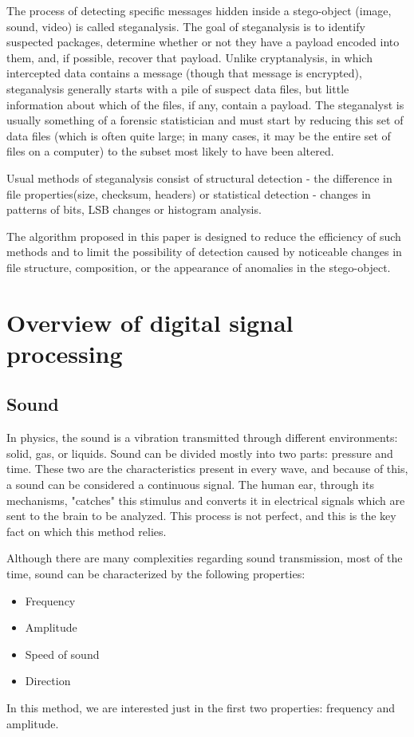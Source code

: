\documentclass[12pt]{report}
\begin{document}
The process of detecting specific messages hidden inside a stego-object (image, sound, video) is called steganalysis. The goal of steganalysis is to identify suspected packages, determine whether or not they have a payload encoded into them, and, if possible, recover that payload. 
Unlike cryptanalysis, in which intercepted data contains a message (though that message is encrypted), steganalysis generally starts with a pile of suspect data files, but little information about which of the files, if any, contain a payload. The steganalyst is usually something of a forensic statistician and must start by reducing this set of data files (which is often quite large; in many cases, it may be the entire set of files on a computer) to the subset most likely to have been altered.

Usual methods of steganalysis consist of structural detection - the difference in file properties(size, checksum, headers) or statistical detection - changes in patterns of bits, LSB changes or histogram analysis.

The algorithm proposed in this paper is designed to reduce the efficiency of such methods and to limit the possibility of detection caused by noticeable changes in file structure, composition, or the appearance of anomalies in the stego-object.

\section{Overview of digital signal processing}
\subsection{Sound}
In physics, the sound is a vibration transmitted through different environments: solid, gas, or liquids. Sound can be divided mostly into two parts: pressure and time. These two are the characteristics present in every wave, and because of this, a sound can be considered a continuous signal. The human ear, through its mechanisms, "catches" this stimulus and converts it in electrical signals which are sent to the brain to be analyzed. This process is not perfect, and this is the key fact on which this method relies.

Although there are many complexities regarding sound transmission, most of the time, sound can be characterized by the following properties:
\begin{itemize}
    \item Frequency
    \item Amplitude
    \item Speed of sound
    \item Direction
\end{itemize}
In this method, we are interested just in the first two properties: frequency and amplitude.
\end{document}
